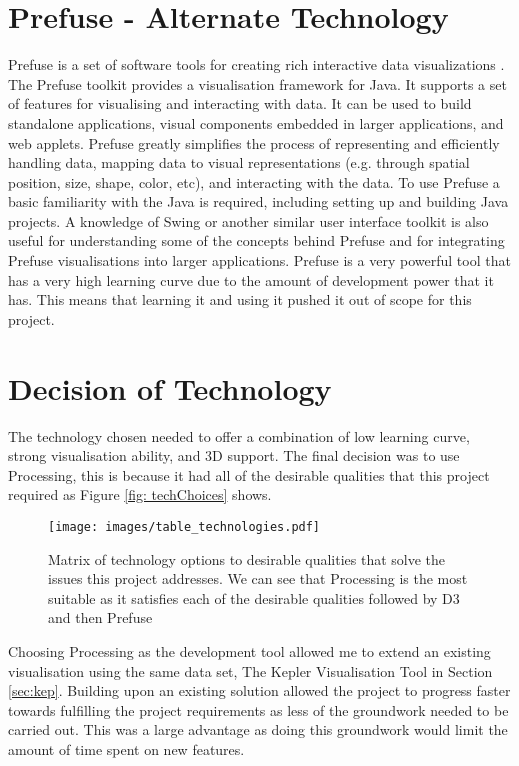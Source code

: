 \section{Prefuse - Alternate Technology}
Prefuse is a set of software tools for creating rich interactive data
visualizations \cite{prefuse}. The
Prefuse toolkit provides a visualisation framework for Java. It supports a set
of features
for visualising and interacting with data. It can be used to build standalone
applications, visual
components embedded
in larger applications, and web applets. Prefuse greatly simplifies the
process
of representing and efficiently handling data, mapping data to visual
representations (e.g.
through spatial position, size, shape, color, etc), and interacting with the
data.
To use Prefuse a basic familiarity with the Java is required, including setting
up and building
Java projects. A knowledge of Swing or another similar user interface toolkit is
also
useful for understanding some of the concepts behind Prefuse and for integrating
Prefuse
visualisations into larger applications. Prefuse is a very powerful tool that
has a very high learning curve due
to the amount of development power that it has. This means that learning it and
using it pushed it out of scope for this project.


\section{Decision of Technology}

The technology chosen needed to offer a combination of low learning curve,
strong visualisation ability, and 3D support.
The final decision was to use Processing, this is because it had all
of the desirable qualities that this project required as Figure \ref{fig:
techChoices} shows. 

\begin{figure}[H]
  \centering
      \texttt{[image: images/table\_technologies.pdf]}
  \caption[Matrix of technology options to desirable qualities]{Matrix of technology options to desirable qualities that solve the issues this project addresses. We can see that Processing is the most suitable as it satisfies each of the desirable qualities followed by D3 and then Prefuse}
  \label{fig: techChoices}
\end{figure}

Choosing Processing as the development tool allowed me to extend an existing visualisation
using the same data set, The Kepler Visualisation Tool in Section \ref{sec:kep}.
Building upon an existing solution allowed the project to progress faster
towards fulfilling the project requirements as less of the groundwork needed to
be carried out. This was a large advantage as doing this groundwork would limit
the amount of time spent on new features.


